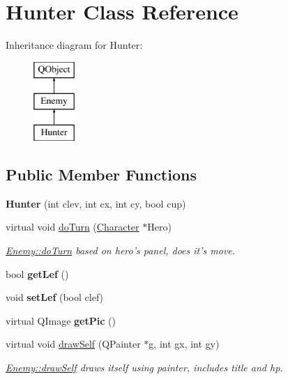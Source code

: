 \hypertarget{class_hunter}{\section{Hunter Class Reference}
\label{class_hunter}
}
Inheritance diagram for Hunter\-:\begin{figure}[H]
\begin{center}
\leavevmode
\includegraphics[height=3.000000cm]{class_hunter}
\end{center}
\end{figure}
\subsection*{Public Member Functions}
\begin{DoxyCompactItemize}
\item 
\hypertarget{class_hunter_a6516ea26662db6188fa2102ae768eca2}{{\bfseries Hunter} (int clev, int cx, int cy, bool cup)}\label{class_hunter_a6516ea26662db6188fa2102ae768eca2}

\item 
virtual void \hyperlink{class_hunter_a910f2c34961a3d7fb1caa91e65b5d743}{do\-Turn} (\hyperlink{class_character}{Character} $\ast$Hero)
\begin{DoxyCompactList}\small\item\em \hyperlink{class_enemy_a56e4b9b07e8cd2a4e5ecfa8ff5b9265a}{Enemy\-::do\-Turn} based on hero's panel, does it's move. \end{DoxyCompactList}\item 
\hypertarget{class_hunter_adc1727098c026b726430a638d4536970}{bool {\bfseries get\-Lef} ()}\label{class_hunter_adc1727098c026b726430a638d4536970}

\item 
\hypertarget{class_hunter_ac1cb95a730a5af30d4fe50b1ff296696}{void {\bfseries set\-Lef} (bool clef)}\label{class_hunter_ac1cb95a730a5af30d4fe50b1ff296696}

\item 
\hypertarget{class_hunter_a407e130c2e904630fd501c329eaeac77}{virtual Q\-Image {\bfseries get\-Pic} ()}\label{class_hunter_a407e130c2e904630fd501c329eaeac77}

\item 
virtual void \hyperlink{class_hunter_a765f282edf2fd27998740d33ed81a423}{draw\-Self} (Q\-Painter $\ast$g, int gx, int gy)
\begin{DoxyCompactList}\small\item\em \hyperlink{class_enemy_a3251244e8e7ac657687d6be5a8da71bb}{Enemy\-::draw\-Self} draws itself using painter, includes title and hp. \end{DoxyCompactList}\end{DoxyCompactItemize}
